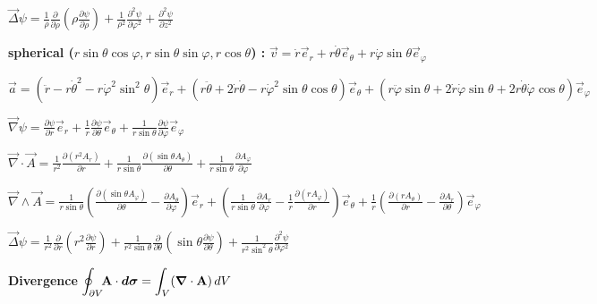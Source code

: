 \item $\vec{\Delta}\psi = \frac{1}{\rho}\frac{\partial}{\partial \rho}\left(\rho\frac{\partial\psi}{\partial \rho}\right) + \frac{1}{\rho^2}\frac{\partial^2\psi}{\partial\varphi^2} + \frac{\partial^2\psi}{\partial z^2}$

\item[] \textbf{spherical ($r\sin\theta\cos\varphi, r\sin\theta\sin\varphi, r \cos \theta$) : \:}
$\vec{v} = \dot{r}\vec{e}_r + r\dot{\theta}\vec{e}_\theta + r\dot{\varphi}\sin\theta\vec{e}_\varphi$

\item $\vec{a} = (\ddot{r} - r\dot{\theta}^2 - r\dot{\varphi}^2\sin^2\theta)\vec{e}_r + (r\ddot{\theta} + 2\dot{r}\dot{\theta} - r\dot{\varphi}^2\sin\theta\cos\theta)\vec{e}_\theta + (r\ddot{\varphi}\sin\theta + 2\dot{r}\dot{\varphi}\sin\theta + 2r\dot{\theta}\dot{\varphi}\cos\theta)\vec{e}_\varphi$

\item $\vec{\nabla}\psi=\frac{\partial \psi}{\partial r}\vec{e}_r+\frac{1}{r}\frac{\partial \psi}{\partial\theta}\vec{e}_{\theta}+\frac{1}{r\sin\theta}\frac{\partial \psi}{\partial \varphi}\vec{e}_\varphi$

\item $\vec{\nabla} \cdot \vec{A}=\frac{1}{r^2}\frac{\partial (r^2A_r)}{\partial r}+\frac{1}{r\sin\theta}\frac{\partial(\sin\theta A_{\theta})}{\partial\theta}+\frac{1}{r\sin\theta}\frac{\partial A_{\varphi}}{\partial\varphi}$

\item $\vec{\nabla} \wedge \vec{A} = \frac{1}{r \sin \theta} \left( \frac{\partial (\sin \theta A_{\varphi})}{\partial \theta} - \frac{\partial A_{\theta}}{\partial \varphi} \right) \vec{e}_r + \left( \frac{1}{r \sin \theta} \frac{\partial A_r}{\partial \varphi} - \frac{1}{r} \frac{\partial (r A_{\varphi})}{\partial r} \right) \vec{e}_{\theta} + \frac{1}{r} \left( \frac{\partial (r A_{\theta})}{\partial r} - \frac{\partial A_r}{\partial \theta} \right) \vec{e}_{\varphi}$

\item $\vec{\Delta}\psi = \frac{1}{r^2}\frac{\partial}{\partial r}\left(r^2\frac{\partial\psi}{\partial r}\right) + \frac{1}{r^2\sin\theta}\frac{\partial}{\partial\theta}\left(\sin\theta\frac{\partial\psi}{\partial\theta}\right) + \frac{1}{r^2\sin^2\theta}\frac{\partial^2\psi}{\partial\varphi^2}$

\squishend
{}%
\squishlist
\item \textbf{Divergence} \quad$\displaystyle{\oint_{\partial V}} \! \vec{\rm{A}} \cdot \vec{d\sigma} = \displaystyle{\int_V} (\vec{\nabla} \cdot \vec{\rm{A}}) \, dV$


